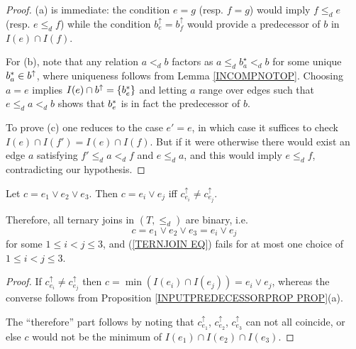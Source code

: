 \documentclass[a4paper,10pt]{article}%
\begin{document}
\begin{proof}
(a) is immediate: the condition $e = g$ (resp. $f = g$) would imply $f \leq_d e$ (resp. $e \leq_d f$)
while the condition $b^{\uparrow}_e = b^{\uparrow}_f$ would provide a predecessor of $b$ in $I(e) \cap I(f)$. 

For (b), note that any relation $a <_d b$ factors as 
$a \leq_d b^{\star}_a <_d b$ for some unique $b^{\**}_a \in b^{\uparrow}$, where uniqueness follows from Lemma \ref{INCOMPNOTOP}. Choosing $a=e$ implies $I(e) \cap b^{\uparrow} = \{b^{\**}_e\}$ and letting $a$ range over edges such that $e \leq_d a <_d b$ shows that $b^{\**}_e$ is in fact the predecessor of $b$.

To prove (c) one reduces to the case $e'=e$, in which case it suffices to check $I(e) \cap I(f') = I(e) \cap I(f)$. But if it were otherwise there would exist an edge $a$ satisfying
$f' \leq_d a <_d f$ and $e \leq_d a$, and this would imply $e \leq_d f$, contradicting our hypothesis.
\end{proof}



\begin{proposition}
\label{TERNARYJOIN PROP}
Let $c = e_1 \vee e_2 \vee e_3$.
Then $c = e_i \vee e_j$ iff $c^{\uparrow}_{e_i} \neq c^{\uparrow}_{e_j}$.

Therefore, all ternary joins in $(T,\leq_d)$ are binary, i.e.
\begin{equation}\label{TERNJOIN EQ}
	c = e_1 \vee e_2 \vee e_3 = e_i \vee e_j
\end{equation}
for some $1\leq i <j \leq 3$, and
(\ref{TERNJOIN EQ}) fails for 
 at most one choice of $1\leq i <j \leq 3$.
\end{proposition}


\begin{proof}
If $c^{\uparrow}_{e_i} \neq c^{\uparrow}_{e_j}$ then
$c = \min\left(I(e_i) \cap I(e_j)\right) = e_i \vee e_j$, whereas the converse follows from Proposition \ref{INPUTPREDECESSORPROP PROP}(a).

The ``therefore'' part follows by noting that 
$c^{\uparrow}_{e_1}$, $c^{\uparrow}_{e_2}$, $c^{\uparrow}_{e_3}$
can not all coincide, or else $c$ would not be the minimum of
$I(e_1) \cap I(e_2) \cap I(e_3)$. 
\end{proof}
\end{document}
